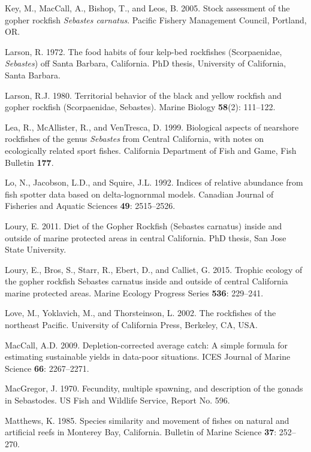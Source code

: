 \documentclass[12pt,]{article}
\begin{document}
\hypertarget{ref-Key2005}{}
Key, M., MacCall, A., Bishop, T., and Leos, B. 2005. Stock assessment of
the gopher rockfish \emph{Sebastes carnatus}. Pacific Fishery Management
Council, Portland, OR.

\hypertarget{ref-Larson1972}{}
Larson, R. 1972. The food habits of four kelp-bed rockfishes
(Scorpaenidae, \emph{Sebastes}) off Santa Barbara, California.
PhD thesis, University of California, Santa Barbara.

\hypertarget{ref-Larson1980}{}
Larson, R.J. 1980. Territorial behavior of the black and yellow rockfish
and gopher rockfish (Scorpaenidae, Sebastes). Marine Biology
\textbf{58}(2): 111--122.

\hypertarget{ref-Lea1999}{}
Lea, R., McAllister, R., and VenTresca, D. 1999. Biological aspects of
nearshore rockfishes of the genus \emph{Sebastes} from Central
California, with notes on ecologically related sport fishes. California
Department of Fish and Game, Fish Bulletin \textbf{177}.

\hypertarget{ref-Lo1992}{}
Lo, N., Jacobson, L.D., and Squire, J.L. 1992. Indices of relative
abundance from fish spotter data based on delta-lognornmal models.
Canadian Journal of Fisheries and Aquatic Sciences \textbf{49}:
2515--2526.

\hypertarget{ref-Loury2011}{}
Loury, E. 2011. Diet of the Gopher Rockfish (Sebastes carnatus) inside
and outside of marine protected areas in central California. PhD thesis,
San Jose State University.

\hypertarget{ref-Loury2015}{}
Loury, E., Bros, S., Starr, R., Ebert, D., and Calliet, G. 2015. Trophic
ecology of the gopher rockfish Sebastes carnatus inside and outside of
central California marine protected areas. Marine Ecology Progress
Series \textbf{536}: 229--241.

\hypertarget{ref-Love2002}{}
Love, M., Yoklavich, M., and Thorsteinson, L. 2002. The rockfishes of
the northeast Pacific. University of California Press, Berkeley, CA,
USA.

\hypertarget{ref-MacCall2009}{}
MacCall, A.D. 2009. Depletion-corrected average catch: A simple formula
for estimating sustainable yields in data-poor situations. ICES Journal
of Marine Science \textbf{66}: 2267--2271.

\hypertarget{ref-MacGregor1970}{}
MacGregor, J. 1970. Fecundity, multiple spawning, and description of the
gonads in Sebastodes. US Fish and Wildlife Service, Report No. 596.

\hypertarget{ref-Matthews1985}{}
Matthews, K. 1985. Species similarity and movement of fishes on natural
and artificial reefs in Monterey Bay, California. Bulletin of Marine
Science \textbf{37}: 252--270.
\end{document}
